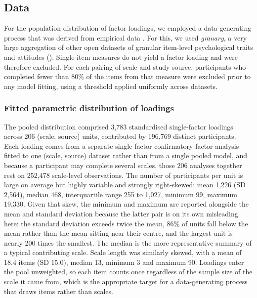 \documentclass[
  nonatbib,
  authoryear,
  preprint]{elsarticle}
\begin{document}
\subsection{Data}\label{data}

For the population distribution of factor loadings, we employed a data
generating process that was derived from empirical data . For this, we
used \emph{granary}, a very large aggregation of other open datasets of
granular item-level psychological traits and attitudes
(). Single-item measures
do not yield a factor loading and were therefore excluded. For each
pairing of scale and study source, participants who completed fewer than
80\% of the items from that measure were excluded prior to any model
fitting, using a threshold applied uniformly across datasets.

\subsubsection{Fitted parametric distribution of
loadings}\label{fitted-parametric-distribution-of-loadings}

The pooled distribution comprised 3,783 standardised single-factor
loadings across 206 (scale, source) units, contributed by 196,769
distinct participants. Each loading comes from a separate single-factor
confirmatory factor analysis fitted to one (scale, source) dataset
rather than from a single pooled model, and because a participant may
complete several scales, those 206 analyses together rest on 252,478
scale-level observations. The number of participants per unit is large
on average but highly variable and strongly right-skewed: mean 1,226 (SD
2,564), median 468, interquartile range 255 to 1,027, minimum 99,
maximum 19,330. Given that skew, the minimum and maximum are reported
alongside the mean and standard deviation because the latter pair is on
its own misleading here: the standard deviation exceeds twice the mean,
86\% of units fall below the mean rather than the mean sitting near
their centre, and the largest unit is nearly 200 times the smallest. The
median is the more representative summary of a typical contributing
scale. Scale length was similarly skewed, with a mean of 18.4 items (SD
15.0), median 13, minimum 3 and maximum 90. Loadings enter the pool
unweighted, so each item counts once regardless of the sample size of
the scale it came from, which is the appropriate target for a
data-generating process that draws items rather than scales.
\end{document}
